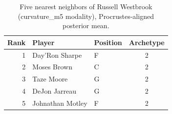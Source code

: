 \begin{table}[htbp]
  \centering\small
  \begin{tabular}{rllc}
    \toprule
    Rank & Player & Position & Archetype \\
    \midrule
    1 & Day'Ron Sharpe & F & 2 \\
    2 & Moses Brown & C & 2 \\
    3 & Taze Moore & G & 2 \\
    4 & DeJon Jarreau & G & 2 \\
    5 & Johnathan Motley & F & 2 \\
    \bottomrule
  \end{tabular}
  \caption{Five nearest neighbors of Russell Westbrook (curvature_m5 modality), Procrustes-aligned posterior mean.}
  \label{tab:Russell_Westbrook_neighbors_curvature_m5}
\end{table}

